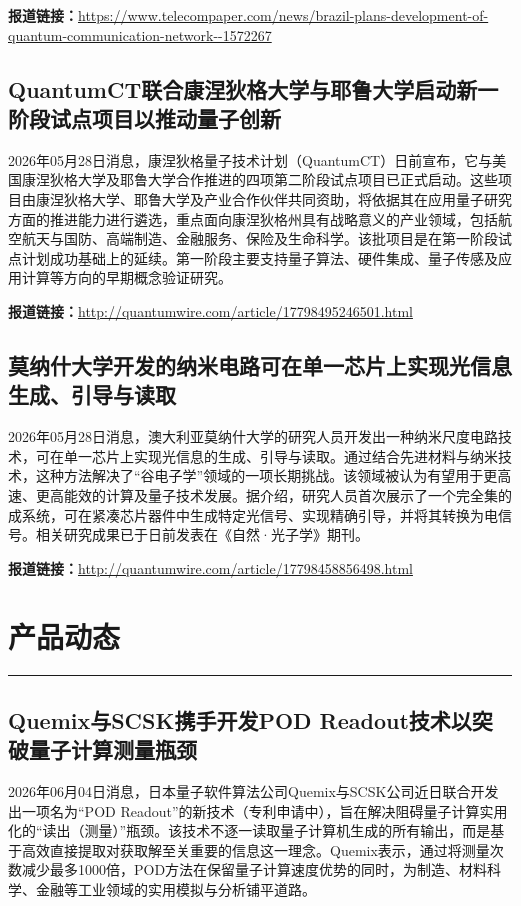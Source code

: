 \documentclass[12pt,a4paper]{ctexart}
\begin{document}
\noindent\textbf{报道链接：}\url{https://www.telecompaper.com/news/brazil-plans-development-of-quantum-communication-network--1572267}

\subsection{ QuantumCT联合康涅狄格大学与耶鲁大学启动新一阶段试点项目以推动量子创新 }

2026年05月28日消息，康涅狄格量子技术计划（QuantumCT）日前宣布，它与美国康涅狄格大学及耶鲁大学合作推进的四项第二阶段试点项目已正式启动。这些项目由康涅狄格大学、耶鲁大学及产业合作伙伴共同资助，将依据其在应用量子研究方面的推进能力进行遴选，重点面向康涅狄格州具有战略意义的产业领域，包括航空航天与国防、高端制造、金融服务、保险及生命科学。该批项目是在第一阶段试点计划成功基础上的延续。第一阶段主要支持量子算法、硬件集成、量子传感及应用计算等方向的早期概念验证研究。

\noindent\textbf{报道链接：}\url{http://quantumwire.com/article/17798495246501.html}

\subsection{ 莫纳什大学开发的纳米电路可在单一芯片上实现光信息生成、引导与读取 }

2026年05月28日消息，澳大利亚莫纳什大学的研究人员开发出一种纳米尺度电路技术，可在单一芯片上实现光信息的生成、引导与读取。通过结合先进材料与纳米技术，这种方法解决了“谷电子学”领域的一项长期挑战。该领域被认为有望用于更高速、更高能效的计算及量子技术发展。据介绍，研究人员首次展示了一个完全集的成系统，可在紧凑芯片器件中生成特定光信号、实现精确引导，并将其转换为电信号。相关研究成果已于日前发表在《自然·光子学》期刊。

\noindent\textbf{报道链接：}\url{http://quantumwire.com/article/17798458856498.html}


\newpage
\section{产品动态}
\vspace{-0.5em}
\noindent\rule{\linewidth}{1.5pt}

\subsection{ Quemix与SCSK携手开发POD Readout技术以突破量子计算测量瓶颈 }

2026年06月04日消息，日本量子软件算法公司Quemix与SCSK公司近日联合开发出一项名为“POD Readout”的新技术（专利申请中），旨在解决阻碍量子计算实用化的“读出（测量）”瓶颈。该技术不逐一读取量子计算机生成的所有输出，而是基于高效直接提取对获取解至关重要的信息这一理念。Quemix表示，通过将测量次数减少最多1000倍，POD方法在保留量子计算速度优势的同时，为制造、材料科学、金融等工业领域的实用模拟与分析铺平道路。
\end{document}
